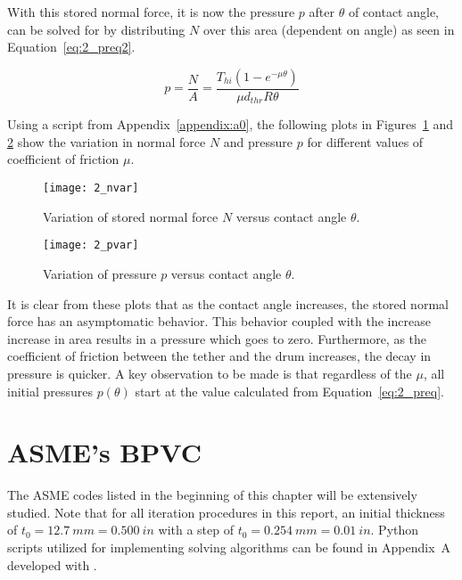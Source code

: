 With this stored normal force, it is now the pressure $p$ after $\theta$ of contact angle,  can be solved for by distributing $N$ over this area (dependent on angle) as seen in Equation~\ref{eq:2_preq2}.

\begin{equation}
	\label{eq:2_preq2}
	p=\frac{N}{A}= \frac{T_{hi} \left( 1 - e^{-\mu \theta} \right)}{\mu d_{thr} R \theta}
\end{equation}

Using a script from Appendix~\ref{appendix:a0}, the following plots in Figures~\ref{fig:2_nvar} and \ref{fig:2_pvar} show the variation in normal force $N$ and pressure $p$ for different values of coefficient of friction $\mu$.

\begin{figure}[H]
	\centering
	\texttt{[image: 2\_nvar]}
	\caption{Variation of stored normal force $N$ versus contact angle $\theta$.}
	\label{fig:2_nvar}
\end{figure}

\begin{figure}[H]
	\centering
	\texttt{[image: 2\_pvar]}
	\caption{Variation of pressure $p$ versus contact angle $\theta$.}
	\label{fig:2_pvar}
\end{figure}

It is clear from these plots that as the contact angle increases, the stored normal force has an asymptomatic behavior. This behavior coupled with the increase increase in area results in a pressure which goes to zero. Furthermore, as the coefficient of friction between the tether and the drum increases, the decay in pressure is quicker. A key observation to be made is that regardless of the $\mu$, all initial pressures $p(\theta)$ start at the value calculated from Equation~\ref{eq:2_preq}.  

\section{ASME's BPVC}

The ASME codes listed in the beginning of this chapter will be extensively studied. Note that for all iteration procedures in this report, an initial thickness of $t_0 = 12.7\ mm=0.500\ in$ with a step of $t_0 = 0.254\ mm=0.01\ in$. Python scripts utilized for implementing solving algorithms can be found in Appendix~A developed with \cite{PYTHON}. 
